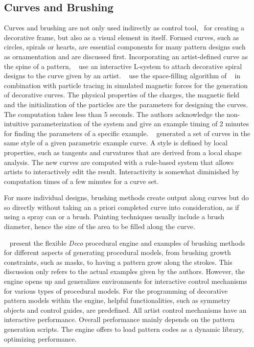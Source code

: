 \subsection{Curves and Brushing}
\label{subsec:analysis_curves}

Curves and brushing are not only used indirectly as control tool, \eg~for creating a decorative frame, but also as a visual element in itself. Formed curves, such as circles, spirals or hearts, are essential components for many pattern designs such as ornamentation and are discussed first. Incorporating an artist-defined curve as the spine of a pattern, \citeauthor*{yu_2012_ans}~\cite{yu_2012_ans} use an interactive L-system to attach decorative spiral designs to the curve given by an artist. \citeauthor*{xu_2009_mcc}~\cite{xu_2009_mcc} use the space-filling algorithm of \citeauthor*{wong_1998_cgf}~\cite{wong_1998_cgf} in combination with particle tracing in simulated magnetic forces for the generation of decorative curves. The physical properties of the charges, the magnetic field and the initialization of the particles are the parameters for designing the curves. The computation takes less than 5 seconds. The authors acknowledge the non-intuitive parameterization of the system and give an example timing of 2 minutes for finding the parameters of a specific example. \citeauthor*{merrell_2010_ecs}~\cite{merrell_2010_ecs} generated a set of curves in the same style of a given parametric example curve. A style is defined by local properties, such as tangents and curvatures that are derived from a local shape analysis. The new curves are computed with a rule-based system that allows artists to interactively edit the result. Interactivity is somewhat diminished by computation times of a few minutes for a curve set. 


For more individual designs, brushing methods create output along curves but do so directly without taking an a priori completed curve into consideration, as if using a spray can or a brush. Painting techniques usually include a brush diameter, hence the size of the area to be filled along the curve. 

\citeauthor*{mech_2012_tdf}~\cite{mech_2012_tdf} present the flexible \textit{Deco} procedural engine and examples of brushing methods for different aspects of generating procedural models, from brushing growth constraints, such as masks, to having a pattern grow along the strokes. This discussion only refers to the actual examples given by the authors. However, the engine opens up and generalizes environments for interactive control mechanisms for various types of procedural models. For the programming of decorative pattern models within the engine, helpful functionalities, such as symmetry objects and control guides, are predefined. All artist control mechanisms have an interactive performance. Overall performance mainly depends on the pattern generation scripts. The engine offers to load pattern codes as a dynamic library, optimizing performance. 

